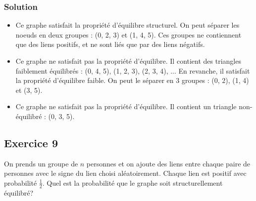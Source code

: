 \begin{center}
\end{center}

    \subsubsection*{Solution}
    \begin{itemize}
        \item Ce graphe satisfait la propriété d'équilibre structurel.
        On peut séparer les noeuds en deux groupes : (0, 2, 3) et (1, 4, 5).
        Ces groupes ne contiennent que des liens positifs, et ne sont liés que par des liens négatifs.
        \item Ce graphe ne satisfait pas la propriété d'équilibre.
        Il contient des triangles faiblement équilibrés : (0, 4, 5), (1, 2, 3), (2, 3, 4), ...
        En revanche, il satisfait la propriété d'équilibre faible.
        On peut le séparer en 3 groupes : (0, 2), (1, 4) et (3, 5).
        \item Ce graphe ne satisfait pas la propriété d'équilibre.
        Il contient un triangle non-équilibré : (0, 3, 5).
    \end{itemize}


\subsection*{Exercice 9}
On prends un groupe de $n$ personnes et on ajoute des liens entre chaque paire de personnes avec le signe du lien choisi aléatoirement. Chaque lien est positif avec probabilit\'{e} $\frac{1}{2}$.
Quel est la probabilit\'{e} que le graphe soit structurellement \'{e}quilibr\'{e}?

